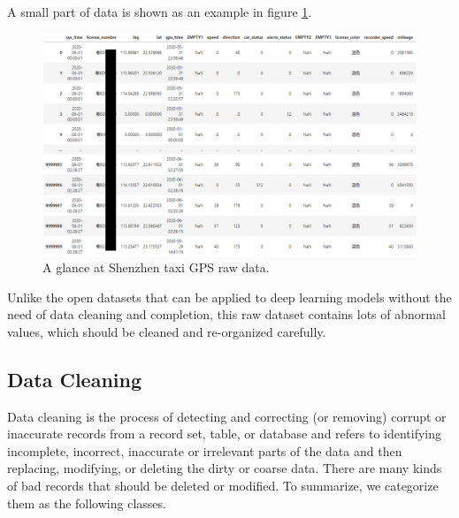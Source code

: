 A small part of data is shown as an example in figure \ref{fig: raw_data}.
\begin{figure}[htb]
    \centering
    \includegraphics[width=\textwidth]{images/raw_data.png}
    \caption{A glance at Shenzhen taxi GPS raw data.}
    \label{fig: raw_data}
\end{figure}

Unlike the open datasets that can be applied to deep learning models without the need of data cleaning and completion, this raw dataset contains lots of abnormal values, which should be cleaned and re-organized carefully.

\subsection{Data Cleaning}
Data cleaning is the process of detecting and correcting (or removing) corrupt or inaccurate records from a record set, table, or database and refers to identifying incomplete, incorrect, inaccurate or irrelevant parts of the data and then replacing, modifying, or deleting the dirty or coarse data\cite{data_cleaning}. There are many kinds of bad records that should be deleted or modified. To summarize, we categorize them as the following classes.

